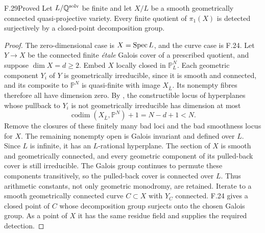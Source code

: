 \begin{claim}{F.29}{Proved}
Let $L/\mathbb Q^{\mathrm{solv}}$ be finite and let $X/L$ be a smooth
geometrically connected quasi-projective variety. Every finite
quotient of $\pi_1(X)$ is detected surjectively by a closed-point
decomposition group.
\end{claim}
\begin{proof}
The zero-dimensional case is $X=\operatorname{Spec} L$, and the curve case
is F.24. Let $Y\to X$ be the connected finite \emph{\'etale}
Galois cover of a prescribed quotient, and suppose $\dim X=d\ge2$.
Embed $X$ locally closed in $\mathbb P^N_L$. Each geometric
component $Y_i$ of $Y$ is geometrically irreducible, since it
is smooth and connected, and its composite to $\mathbb P^N$
is quasi-finite with image $X_{\bar L}$. Its nonempty fibres
therefore all have dimension zero.
By \citet[Theorem~1.5]{F_PoonenSlavov2020}, the constructible
locus of hyperplanes whose pullback to $Y_i$ is not geometrically
irreducible has dimension at most
\[
 \operatorname{codim}(X_{\bar L},\mathbb P^N)+1
       =N-d+1<N.
\]
Remove the closures of these finitely many bad loci and the bad
smoothness locus for $X$. The remaining nonempty open is
Galois invariant and defined over $L$. Since $L$ is infinite,
it has an $L$-rational hyperplane. The section of $X$ is smooth
and geometrically connected, and every geometric component of
its pulled-back cover is still irreducible. The Galois group
continues to permute these components transitively, so the
pulled-back cover is connected over $L$. Thus arithmetic
constants, not only geometric monodromy, are retained.
Iterate to a smooth geometrically connected curve $C\subset X$
with $Y_C$ connected. F.24 gives a closed point of $C$ whose
decomposition group surjects onto the chosen Galois group.
As a point of $X$ it has the same residue field and supplies
the required detection.
\end{proof}

